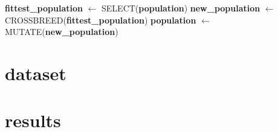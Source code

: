 \documentclass{article}
\begin{document}
\begin{algorithm}[H]
    \begin{algorithmic}[1]
        \State \textbf{fittest\_population} $\leftarrow$ SELECT(\textbf{population})
        \State \textbf{new\_population} $\leftarrow$ CROSSBREED(\textbf{fittest\_population})
       \State \textbf{population} $\leftarrow$ MUTATE(\textbf{new\_population})
       \EndFunction
\end{algorithmic}
\end{algorithm}
\section{dataset}

\section{results}
\end{document}
